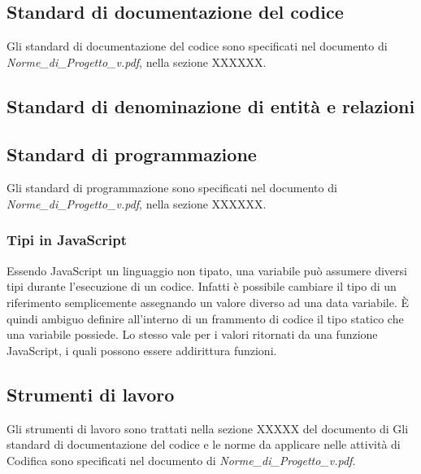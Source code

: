 \subsection{Standard di documentazione del codice}
Gli standard di documentazione del codice sono specificati nel documento di 
\emph{Norme\_{}di\_{}Progetto\_{}v\versioneNormeDiProgetto{}.pdf}, nella sezione XXXXXX.	%

\subsection{Standard di denominazione di entità e relazioni}

\subsection{Standard di programmazione}
Gli standard di programmazione sono specificati nel documento di 
\emph{Norme\_{}di\_{}Progetto\_{}v\versioneNormeDiProgetto{}.pdf}, nella sezione XXXXXX.	%
\subsubsection{Tipi in JavaScript}
Essendo JavaScript un linguaggio non tipato, una variabile può assumere diversi tipi durante l'esecuzione
di un codice. Infatti è possibile cambiare il tipo di un riferimento semplicemente assegnando un valore diverso ad
una data variabile. \`{E} quindi ambiguo definire all'interno di un frammento di codice il tipo statico che una variabile
possiede. Lo stesso vale per i valori ritornati da una funzione JavaScript, i quali possono essere addirittura funzioni.






\subsection{Strumenti di lavoro}
Gli strumenti di lavoro sono trattati nella sezione XXXXX del documento di	%
Gli standard di documentazione del codice e le norme da applicare nelle attività 
di Codifica sono specificati nel documento di \emph{Norme\_{}di\_{}Progetto\_{}v\versioneNormeDiProgetto{}.pdf}.


